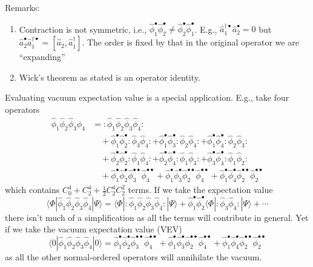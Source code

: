 Remarks:
\begin{enumerate}
    \item Contraction is not symmetric, i.e., $\hat{\phi}_{1}^{\bullet}\hat{\phi}_{2}^{\bullet}\ne \hat{\phi}_{2}^{\bullet}\hat{\phi}_{1}^{\bullet}$. E.g., $\hat{a}_{1}^{\dagger \bullet}\hat{a}_{2}^{\bullet}=0$ but $\hat{a}_{2}^{\bullet}\hat{a}_{1}^{\dagger \bullet}=\left[ \hat{a}_2,\hat{a}_{1}^{\dagger} \right] $. The order is fixed by that in the original operator we are ``expanding''
    \item Wick's theorem as stated is an operator identity.
\end{enumerate}
Evaluating vacuum expectation value is a special application. E.g., take four operators
\begin{align*}
    \hat{\phi}_1\hat{\phi}_2\hat{\phi}_3\hat{\phi}_4&=:\hat{\phi}_1\hat{\phi}_2\hat{\phi}_3\hat{\phi}_4:\\
    &\quad+\hat{\phi}_{1}^{\bullet}\hat{\phi}_{2}^{\bullet}:\hat{\phi}_3\hat{\phi}_4:+\hat{\phi}_{1}^{\bullet}\hat{\phi}_{3}^{\bullet}:\hat{\phi}_2\hat{\phi}_4:+\hat{\phi}_{1}^{\bullet}\hat{\phi}_{4}^{\bullet}:\hat{\phi}_2\hat{\phi}_3:\\
    &\quad+\hat{\phi}_{2}^{\bullet}\hat{\phi}_{2}^{\bullet}:\hat{\phi}_1\hat{\phi}_4:+\hat{\phi}_{2}^{\bullet}\hat{\phi}_{4}^{\bullet}:\hat{\phi}_1\hat{\phi}_3:+\hat{\phi}_{3}^{\bullet}\hat{\phi}_{4}^{\bullet}:\hat{\phi}_1\hat{\phi}_2:\\
    &\quad+\hat{\phi}_{1}^{\bullet}\hat{\phi}_{2}^{\bullet}\hat{\phi}_{3}^{\bullet \bullet}\hat{\phi}_{4}^{\bullet \bullet}+\hat{\phi}_{1}^{\bullet}\hat{\phi}_{3}^{\bullet}\hat{\phi}_{2}^{\bullet \bullet}\hat{\phi}_{4}^{\bullet \bullet}+\hat{\phi}_{1}^{\bullet}\hat{\phi}_{4}^{\bullet}\hat{\phi}_{2}^{\bullet \bullet}\hat{\phi}_{2}^{\bullet \bullet}
\end{align*}
which contains $C_{0}^{4}+C_{2}^{4}+\frac{1}{2}C_{2}^{4}C_{2}^{2}$ terms. If we take the expectation value
\[ \langle \Phi |\hat{\phi}_1\hat{\phi}_2\hat{\phi}_3\hat{\phi}_4|\Psi \rangle =\langle \Phi |:\hat{\phi}_1\hat{\phi}_2\hat{\phi}_3\hat{\phi}_4:|\Psi \rangle +\hat{\phi}_{1}^{\bullet}\hat{\phi}_{2}^{\bullet}\langle \Phi |:\hat{\phi}_3\hat{\phi}_4:|\Psi \rangle +\cdots \]
there isn't much of a simplification as all the terms will contribute in general. Yet if we take the vacuum expectation value (VEV)
\[ \langle 0|\hat{\phi}_1\hat{\phi}_2\hat{\phi}_3\hat{\phi}_4|0\rangle =\hat{\phi}_{1}^{\bullet}\hat{\phi}_{2}^{\bullet}\hat{\phi}_{3}^{\bullet \bullet}\hat{\phi}_{4}^{\bullet \bullet}+\hat{\phi}_{1}^{\bullet}\hat{\phi}_{3}^{\bullet}\hat{\phi}_{2}^{\bullet \bullet}\hat{\phi}_{4}^{\bullet \bullet}+\hat{\phi}_{1}^{\bullet}\hat{\phi}_{4}^{\bullet}\hat{\phi}_{2}^{\bullet \bullet}\hat{\phi}_{2}^{\bullet \bullet}\]
as all the other normal-ordered operators will annihilate the vacuum.

